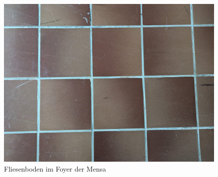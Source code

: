 \documentclass[../main.tex]{subfiles}
\begin{document}
\begin{figure} [ht]
  \centering
  \includegraphics[scale=0.05]{../resources/Fliesenboden.jpg}
  \caption{Fliesenboden im Foyer der Mensa}
  \label{fig:fliesenboden}
\end{figure}

\newpage
\end{document}
